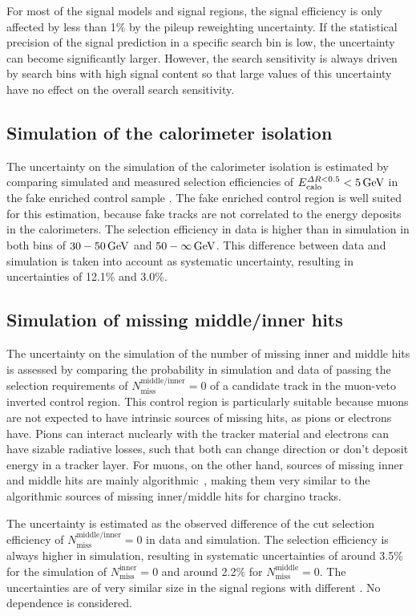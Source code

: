 For most of the signal models and signal regions, the signal efficiency is only affected by less than 1\% by the pileup reweighting uncertainty.
If the statistical precision of the signal prediction in a specific search bin is low, the uncertainty can become significantly larger.
However, the search sensitivity is always driven by search bins with high signal content so that large values of this uncertainty have no effect on the overall search sensitivity.

\subsection*{Simulation of the calorimeter isolation}
The uncertainty on the simulation of the calorimeter isolation \ecalo is estimated by comparing simulated and measured selection efficiencies of $E^{\Delta R<0.5}_{\text{calo}}<5\,\text{Ge}\kern-0.06667em\text{V}$ in the fake enriched control sample \fakeCR.
The fake enriched control region is well suited for this estimation, because fake tracks are not correlated to the energy deposits in the calorimeters.
The selection efficiency in data is higher than in simulation in both \pt bins of $30-50\,\text{Ge}\kern-0.06667em\text{V}$ and $50-\infty\,\text{Ge}\kern-0.06667em\text{V}$.
This difference between data and simulation is taken into account as systematic uncertainty, resulting in uncertainties of 12.1\% and 3.0\%.

\subsection*{Simulation of missing middle/inner hits}
The uncertainty on the simulation of the number of missing inner and middle hits is assessed by comparing the probability in simulation and data of passing the selection requirements of $N_{\text{miss}}^{\text{middle/inner}}=0$
of a candidate track in the muon-veto inverted control region. 
This control region is particularly suitable because muons are not expected to have intrinsic sources of missing hits, as \eg pions or electrons have.
Pions can interact nuclearly with the tracker material and electrons can have sizable radiative losses, such that both can change direction or don't deposit energy in a tracker layer.
For muons, on the other hand, sources of missing inner and middle hits are mainly algorithmic~\cite{bib:CMS:DT_Thesis,bib:CMS:DT_8TeV_AN}, 
making them very similar to the algorithmic sources of missing inner/middle hits for chargino tracks.

The uncertainty is estimated as the observed difference of the cut selection efficiency of $N_{\text{miss}}^{\text{middle/inner}}=0$ in data and simulation.
The selection efficiency is always higher in simulation, resulting in systematic uncertainties of around 3.5\% for the simulation of $N_{\text{miss}}^{\text{inner}}=0$ and around 2.2\% for $N_{\text{miss}}^{\text{middle}}=0$.
The uncertainties are of very similar size in the signal regions with different \pt.
No \ias dependence is considered.

